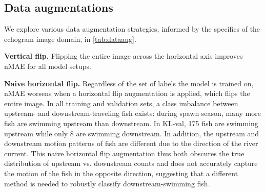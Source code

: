


\subsection{Data augmentations}


We explore various data augmentation strategies, informed by the specifics of the echogram image domain, in \cref{tab:dataaug}.

\noindent
\textbf{Vertical flip.} Flipping the entire image across the horizontal axis improves nMAE for all model setups.

\noindent
\textbf{Naive horizontal flip.} Regardless of the set of labels the model is trained on, nMAE worsens when a horizontal flip augmentation is applied, which flips the entire image. In all training and validation sets, a class imbalance between upstream- and downstream-traveling fish exists: during spawn season, many more fish are swimming upstream than downstream. In KL-val, 175 fish are swimming upstream while only 8 are swimming downstream. In addition, the upstream and downstream motion patterns of fish are different due to the direction of the river current. This naive horizontal flip augmentation thus both obscures the true distribution of upstream vs. downstream counts and does not accurately capture the motion of the fish in the opposite direction, suggesting that a different method is needed to robustly classify downstream-swimming fish.

